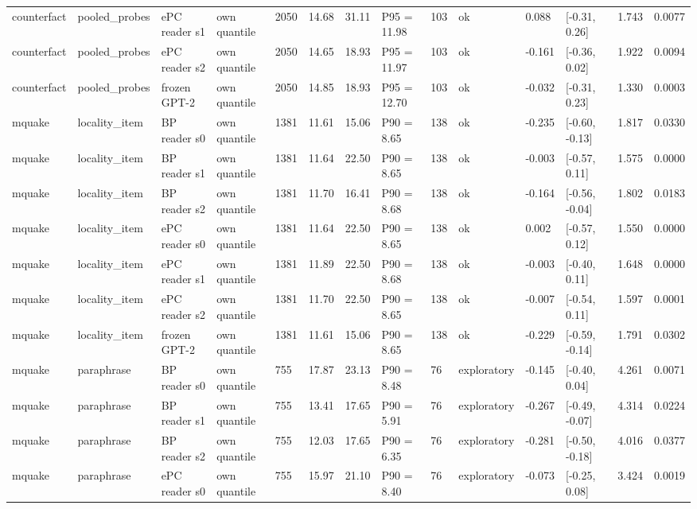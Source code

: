 \documentclass[10pt,a4paper]{article}
\begin{document}
\begin{center}
\begin{tabularx}{\textwidth}{@{}p{}XXXXXXXXXXXXX@{}}
counterfact & pooled\_probes & ePC reader s1 & own quantile & 2050 & 14.68 & 31.11 & P95 = 11.98 & 103 & ok & 0.088 & [-0.31, 0.26] & 1.743 & 0.0077 \\
counterfact & pooled\_probes & ePC reader s2 & own quantile & 2050 & 14.65 & 18.93 & P95 = 11.97 & 103 & ok & -0.161 & [-0.36, 0.02] & 1.922 & 0.0094 \\
counterfact & pooled\_probes & frozen GPT-2 & own quantile & 2050 & 14.85 & 18.93 & P95 = 12.70 & 103 & ok & -0.032 & [-0.31, 0.23] & 1.330 & 0.0003 \\
mquake & locality\_item & BP reader s0 & own quantile & 1381 & 11.61 & 15.06 & P90 = 8.65 & 138 & ok & -0.235 & [-0.60, -0.13] & 1.817 & 0.0330 \\
mquake & locality\_item & BP reader s1 & own quantile & 1381 & 11.64 & 22.50 & P90 = 8.65 & 138 & ok & -0.003 & [-0.57, 0.11] & 1.575 & 0.0000 \\
mquake & locality\_item & BP reader s2 & own quantile & 1381 & 11.70 & 16.41 & P90 = 8.68 & 138 & ok & -0.164 & [-0.56, -0.04] & 1.802 & 0.0183 \\
mquake & locality\_item & ePC reader s0 & own quantile & 1381 & 11.64 & 22.50 & P90 = 8.65 & 138 & ok & 0.002 & [-0.57, 0.12] & 1.550 & 0.0000 \\
mquake & locality\_item & ePC reader s1 & own quantile & 1381 & 11.89 & 22.50 & P90 = 8.68 & 138 & ok & -0.003 & [-0.40, 0.11] & 1.648 & 0.0000 \\
mquake & locality\_item & ePC reader s2 & own quantile & 1381 & 11.70 & 22.50 & P90 = 8.65 & 138 & ok & -0.007 & [-0.54, 0.11] & 1.597 & 0.0001 \\
mquake & locality\_item & frozen GPT-2 & own quantile & 1381 & 11.61 & 15.06 & P90 = 8.65 & 138 & ok & -0.229 & [-0.59, -0.14] & 1.791 & 0.0302 \\
mquake & paraphrase & BP reader s0 & own quantile & 755 & 17.87 & 23.13 & P90 = 8.48 & 76 & exploratory & -0.145 & [-0.40, 0.04] & 4.261 & 0.0071 \\
mquake & paraphrase & BP reader s1 & own quantile & 755 & 13.41 & 17.65 & P90 = 5.91 & 76 & exploratory & -0.267 & [-0.49, -0.07] & 4.314 & 0.0224 \\
mquake & paraphrase & BP reader s2 & own quantile & 755 & 12.03 & 17.65 & P90 = 6.35 & 76 & exploratory & -0.281 & [-0.50, -0.18] & 4.016 & 0.0377 \\
mquake & paraphrase & ePC reader s0 & own quantile & 755 & 15.97 & 21.10 & P90 = 8.40 & 76 & exploratory & -0.073 & [-0.25, 0.08] & 3.424 & 0.0019 \\

\end{tabularx}
\end{center}
\end{document}
